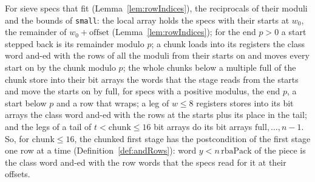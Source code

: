 \begin{lemma}\label{lem:andRowsChunked}
  \leanok
  For sieve specs that fit (Lemma~\ref{lem:rowIndices}), the reciprocals of their moduli and the
  bounds of \verb|small|: the local array holds the specs with their starts at $w_0$, the remainder
  of $w_0 + \mathrm{offset}$ (Lemma~\ref{lem:rowIndices}); for the end $p > 0$ a start stepped back
  is its remainder modulo $p$; a chunk loads into its registers the class word and-ed with the rows
  of all the moduli from their starts on and moves every start on by the chunk modulo $p$; the whole
  chunks below a multiple $\mathrm{full}$ of the chunk store into their bit arrays the words that
  the stage reads from the starts and move the starts on by $\mathrm{full}$, for specs with a
  positive modulus, the end $p$, a start below $p$ and a row that wraps; a leg of $w \le 8$
  registers stores into its bit arrays the class word and-ed with the rows at the starts plus its
  place in the tail; and the legs of a tail of $t < \mathrm{chunk} \le 16$ bit arrays do its bit
  arrays $\mathrm{full}, \dots, n - 1$. So, for $\mathrm{chunk} \le 16$, the chunked first stage has
  the postcondition of the first stage one row at a time (Definition~\ref{def:andRows}): word
  $y < n\,\mathrm{rbaPack}$ of the piece is the class word and-ed with the row words that the specs
  read for it at their offsets.
\end{lemma}

